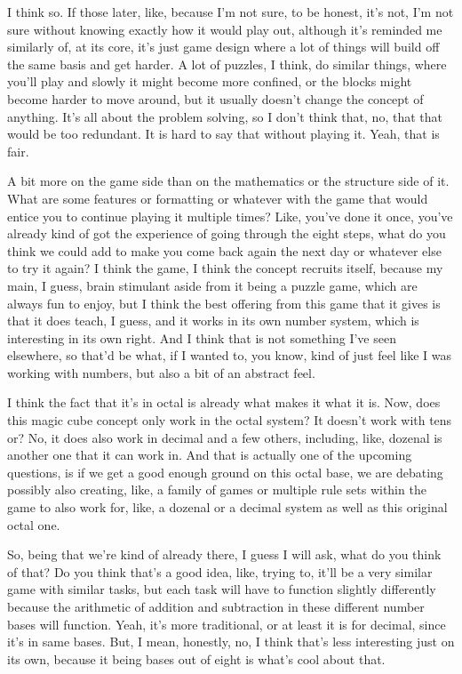 \documentclass{article}
\begin{document}
I think so. If those later, like, because I'm not sure, to be honest, it's not, I'm not sure without
knowing exactly how it would play out, although it's reminded me similarly of, at its core, it's just
game design where a lot of things will build off the same basis and get harder. A lot of puzzles, I
think, do similar things, where you'll play and slowly it might become more confined, or the blocks
might become harder to move around, but it usually doesn't change the concept of anything.
It's all about the problem solving, so I don't think that, no, that that would be too redundant. It is
hard to say that without playing it. Yeah, that is fair.

A bit more on the game side than on the mathematics or the structure side of it. What are some
features or formatting or whatever with the game that would entice you to continue playing it
multiple times? Like, you've done it once, you've already kind of got the experience of going
through the eight steps, what do you think we could add to make you come back again the next
day or whatever else to try it again? I think the game, I think the concept recruits itself, because
my main, I guess, brain stimulant aside from it being a puzzle game, which are always fun to
enjoy, but I think the best offering from this game that it gives is that it does teach, I guess, and it
works in its own number system, which is interesting in its own right. And I think that is not
something I've seen elsewhere, so that'd be what, if I wanted to, you know, kind of just feel like I
was working with numbers, but also a bit of an abstract feel.

I think the fact that it's in octal is already what makes it what it is. Now, does this magic cube
concept only work in the octal system? It doesn't work with tens or? No, it does also work in
decimal and a few others, including, like, dozenal is another one that it can work in. And that is
actually one of the upcoming questions, is if we get a good enough ground on this octal base, we
are debating possibly also creating, like, a family of games or multiple rule sets within the game
to also work for, like, a dozenal or a decimal system as well as this original octal one.

So, being that we're kind of already there, I guess I will ask, what do you think of that? Do you
think that's a good idea, like, trying to, it'll be a very similar game with similar tasks, but each task
will have to function slightly differently because the arithmetic of addition and subtraction in these
different number bases will function. Yeah, it's more traditional, or at least it is for decimal, since
it's in same bases. But, I mean, honestly, no, I think that's less interesting just on its own,
because it being bases out of eight is what's cool about that.
\end{document}
